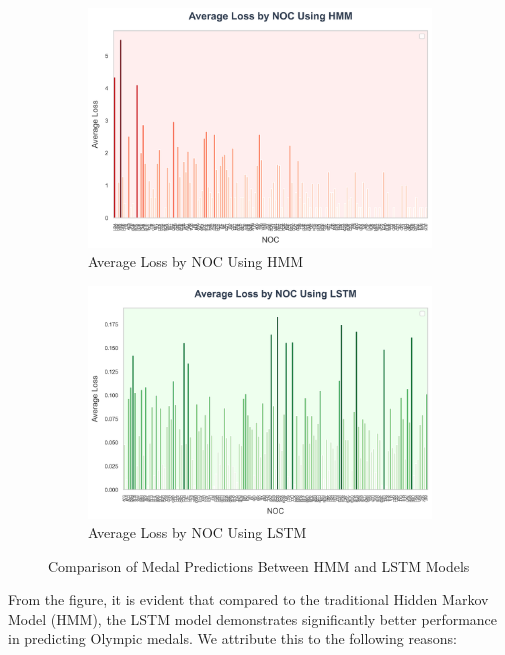 \documentclass{mcmthesis}
\begin{document}
\begin{figure}[htbp]
    \centering
    \begin{subfigure}{0.45\textwidth}
        \centering
        \includegraphics[width=\textwidth]{graph/Average Loss by NOC Using HMM.png}
        \caption{Average Loss by NOC Using HMM}
        \label{subfig:player1}
    \end{subfigure}
    \hfill
    \begin{subfigure}{0.45\textwidth}
        \centering
        \includegraphics[width=\textwidth]{graph/Average Loss by NOC Using LSTM.png}
        \caption{Average Loss by NOC Using LSTM}
        \label{subfig:player2}
    \end{subfigure}
    \caption{Comparison of Medal Predictions Between HMM and LSTM Models}
    \label{Figure6-7}
\end{figure}
From the figure, it is evident that compared to the traditional Hidden Markov Model (HMM), the LSTM model demonstrates significantly better performance in predicting Olympic medals. We attribute this to the following reasons:
\end{document}
